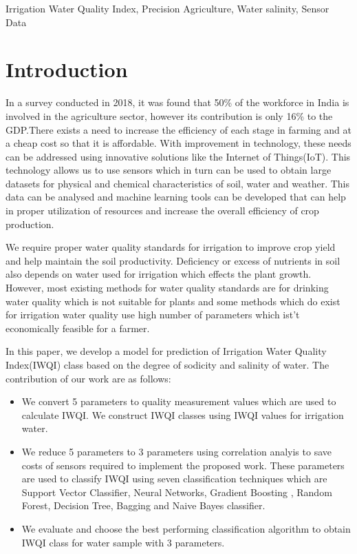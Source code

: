 \documentclass[conference]{IEEEtran}
\begin{document}
\begin{IEEEkeywords}
Irrigation Water Quality Index, Precision Agriculture, Water salinity, Sensor Data
\end{IEEEkeywords}

\section{Introduction}
In a survey conducted in 2018, it was found that 50\% of the workforce in India is involved in the agriculture sector, however its contribution is only 16\% to the GDP\cite{article:indianEconomicSurvey}.There exists a need to increase the efficiency of each stage in farming and at a cheap cost so that it is affordable. With improvement in technology, these needs can be addressed using innovative solutions like the Internet of Things(IoT). This technology allows us to use sensors which in turn can be used to obtain large datasets for physical and chemical characteristics of soil, water and weather. This data can be analysed and machine learning tools can be developed that can help in proper utilization of resources and increase the overall efficiency of crop production. 

We require proper water quality standards for irrigation to improve crop yield and help maintain the soil productivity. Deficiency or excess of nutrients in soil also depends on water used for irrigation which effects the plant growth. However, most existing methods for water quality standards are for drinking water quality which is not suitable for plants and some methods which do exist for irrigation water quality use high number of parameters which ist't economically feasible for a farmer.


In this paper, we develop a model for prediction of Irrigation Water Quality Index(IWQI) class  based on the degree of sodicity and salinity of water. The contribution of our work are as follows:

\begin{itemize}
    \item We convert 5 parameters to quality measurement values which are used to calculate IWQI. We construct IWQI classes using IWQI values for irrigation water.
    \item  We reduce 5 parameters to 3 parameters using correlation analyis to save costs of sensors required to implement the proposed work. These parameters are used to classify IWQI using seven classification techniques which are Support Vector Classifier, Neural Networks, Gradient Boosting , Random Forest, Decision Tree, Bagging and Naive Bayes classifier.
    \item We evaluate and choose the best performing classification algorithm to obtain IWQI class for water sample with 3 parameters.
\end{itemize}
\end{document}

